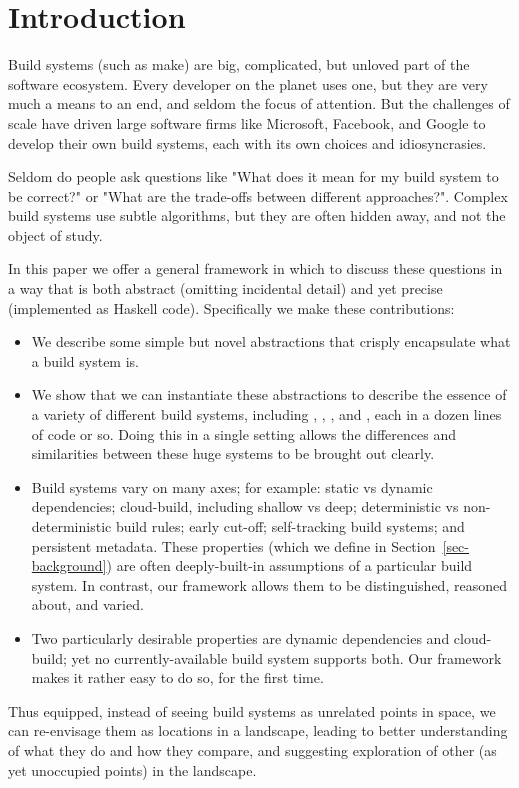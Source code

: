 \section{Introduction}\label{sec-intro}

Build systems (such as make) are big, complicated, but unloved part of
the software ecosystem.  Every developer on the planet uses one, but
they are very much a means to an end, and seldom the focus of
attention.  But the challenges of scale have driven large software firms
like Microsoft, Facebook, and Google to develop their own build
systems, each with its own choices and idiosyncrasies.

Seldom do people ask questions like "What does it mean for my build
system to be correct?" or "What are the trade-offs between different
approaches?".  Complex build systems use subtle algorithms, but they
are often hidden away, and not the object of study.

In this paper we offer a general framework in which to discuss these
questions in a way that is both abstract (omitting incidental detail)
and yet precise (implemented as Haskell code).  Specifically we make
these contributions:
\begin{itemize}
\item We describe some simple but novel abstractions that
crisply encapsulate what a build system is.
\item We show that we can instantiate
these abstractions to describe the essence of a variety of different
build systems, including \Make, \Shake, \Bazel, and \Excel, each in
a dozen lines of code or so.
Doing this in a single setting allows
the differences and similarities between these huge systems to be
brought out clearly.
\item Build systems vary on many axes;
for example: static vs dynamic dependencies; cloud-build, including
shallow vs deep; deterministic vs non-deterministic build rules;
early cut-off; self-tracking build systems; and persistent metadata.
These properties (which we define in Section~\ref{sec-background}) are often
deeply-built-in assumptions of a particular build system.
In contrast, our framework allows them to be distinguished,
reasoned about, and varied.
\item Two particularly desirable properties are dynamic dependencies
and cloud-build; yet no currently-available build system supports
both.  Our framework makes it rather easy to do so, for the first
time.
\end{itemize}
Thus equipped, instead of seeing build systems as unrelated
points in space, we can re-envisage them as locations in a landscape,
leading to better understanding of what they do and how they compare,
and suggesting exploration of other (as yet unoccupied points) in the
landscape.

